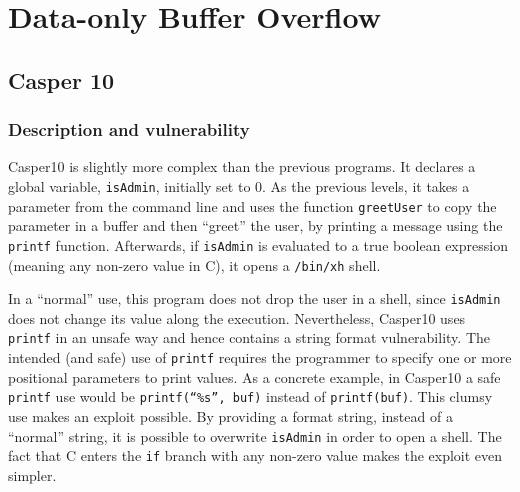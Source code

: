 \section{Data-only Buffer Overflow}
\subsection{Casper 10}
\subsubsection{Description and vulnerability}
Casper10 is slightly more complex than the previous programs. It declares a global variable, \texttt{isAdmin}, initially set to 0. As the previous levels, it takes a parameter from the command line and uses the function \texttt{greetUser} to copy the parameter in a buffer and then ``greet'' the user, by printing a message using the \texttt{printf} function. Afterwards, if \texttt{isAdmin} is evaluated to a true boolean expression (meaning any non-zero value in C), it opens a \texttt{/bin/xh} shell. 

In a ``normal'' use, this program does not drop the user in a shell, since \texttt{isAdmin} does not change its value along the execution. Nevertheless, Casper10 uses \texttt{printf} in an unsafe way and hence contains a string format vulnerability. The intended (and safe) use of \texttt{printf} requires the programmer to specify one or more positional parameters to print values. As a concrete example, in Casper10 a safe \texttt{printf} use would be \texttt{printf(``\%s'', buf)} instead of \texttt{printf(buf)}. This clumsy use makes an exploit possible. By providing a format string, instead of a ``normal'' string, it is possible to overwrite \texttt{isAdmin} in order to open a shell. The fact that C enters the \texttt{if} branch with any non-zero value makes the exploit even simpler. 

